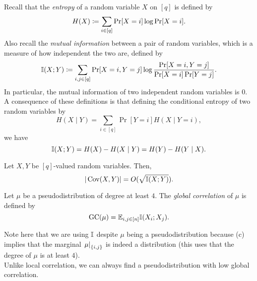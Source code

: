 	Recall that the \emph{entropy} of a random variable $X$ on $[q]$ is defined by
	\[ H(X) \coloneqq \sum_{i \in [q]} \Pr[X = i] \log \Pr[X = i]. \]
	Also recall the \emph{mutual information} between a pair of random variables, which is a measure of how independent the two are, defined by
	\[ \mathbb{I}(X;Y) \coloneqq \sum_{i,j \in [q]} \Pr[X=i,Y=j] \log \frac{\Pr[X=i,Y=j]}{\Pr[X=i]\Pr[Y=j]}. \]
	In particular, the mutual information of two independent random variables is $0$. A consequence of these definitions is that defining the conditional entropy of two random variables by
	\[ H(X\mid Y) = \sum_{i \in [q]} \Pr[Y = i] H(X \mid Y = i), \]
	we have
	\[ \mathbb{I}(X;Y) = H(X) - H(X\mid Y) = H(Y) - H(Y\mid X). \]

	\begin{fprop}
		\label{prop:cov-mutinfo}
		Let $X,Y$ be $[q]$-valued random variables. Then,
		\[ |\operatorname{Cov}(X,Y)| = O(\sqrt{\mathbb{I}(X;Y)}). \]
	\end{fprop}

	\begin{fdef}
		Let $\mu$ be a pseudodistribution of degree at least $4$. The \emph{global correlation} of $\mu$ is defined by
		\[ \operatorname{GC}(\mu) = \mathbb{E}_{i,j \in [n]} \mathbb{I}(X_i;X_j). \]
	\end{fdef}
	Note here that we are using $\mathbb{I}$ despite $\mu$ being a pseudodistribution because (c) implies that the marginal $\left.\mu\right|_{\{i,j\}}$ is indeed a distribution (this uses that the degree of $\mu$ is at least $4$).\\
	Unlike local correlation, we can always find a pseudodistribution with low global correlation.

